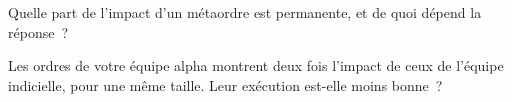 \begin{interviewq}\label{iq:mx:the-empirics-of-price-impact:5}
Quelle part de l'impact d'un métaordre est permanente, et de quoi dépend la réponse~?
\end{interviewq}

\begin{interviewq}\label{iq:mx:the-empirics-of-price-impact:6}
Les ordres de votre équipe alpha montrent deux fois l'impact de ceux de l'équipe indicielle, pour une même taille. Leur exécution est-elle moins bonne~?
\end{interviewq}
